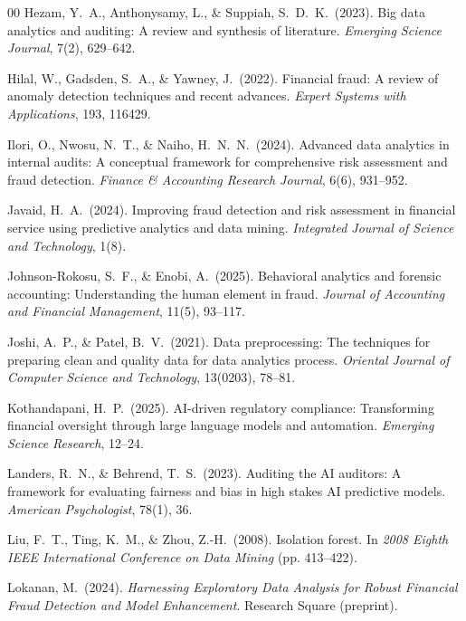 \documentclass[preprint,12pt]{elsarticle}
\begin{document}
\begin{thebibliography}{00}
 Hezam, Y.\ A., Anthonysamy, L., \& Suppiah, S.\ D.\ K.\ (2023). Big data analytics and auditing: A review and synthesis of literature. \emph{Emerging Science Journal}, 7(2), 629--642.

 Hilal, W., Gadsden, S.\ A., \& Yawney, J.\ (2022). Financial fraud: A review of anomaly detection techniques and recent advances. \emph{Expert Systems with Applications}, 193, 116429.

 Ilori, O., Nwosu, N.\ T., \& Naiho, H.\ N.\ N.\ (2024). Advanced data analytics in internal audits: A conceptual framework for comprehensive risk assessment and fraud detection. \emph{Finance \& Accounting Research Journal}, 6(6), 931--952.

 Javaid, H.\ A.\ (2024). Improving fraud detection and risk assessment in financial service using predictive analytics and data mining. \emph{Integrated Journal of Science and Technology}, 1(8).

 Johnson-Rokosu, S.\ F., \& Enobi, A.\ (2025). Behavioral analytics and forensic accounting: Understanding the human element in fraud. \emph{Journal of Accounting and Financial Management}, 11(5), 93--117.

 Joshi, A.\ P., \& Patel, B.\ V.\ (2021). Data preprocessing: The techniques for preparing clean and quality data for data analytics process. \emph{Oriental Journal of Computer Science and Technology}, 13(0203), 78--81.

 Kothandapani, H.\ P.\ (2025). AI-driven regulatory compliance: Transforming financial oversight through large language models and automation. \emph{Emerging Science Research}, 12--24.

 Landers, R.\ N., \& Behrend, T.\ S.\ (2023). Auditing the AI auditors: A framework for evaluating fairness and bias in high stakes AI predictive models. \emph{American Psychologist}, 78(1), 36.

 Liu, F.\ T., Ting, K.\ M., \& Zhou, Z.-H.\ (2008). Isolation forest. In \emph{2008 Eighth IEEE International Conference on Data Mining} (pp. 413--422).

 Lokanan, M.\ (2024). \emph{Harnessing Exploratory Data Analysis for Robust Financial Fraud Detection and Model Enhancement}. Research Square (preprint).


\end{thebibliography}
\end{document}
